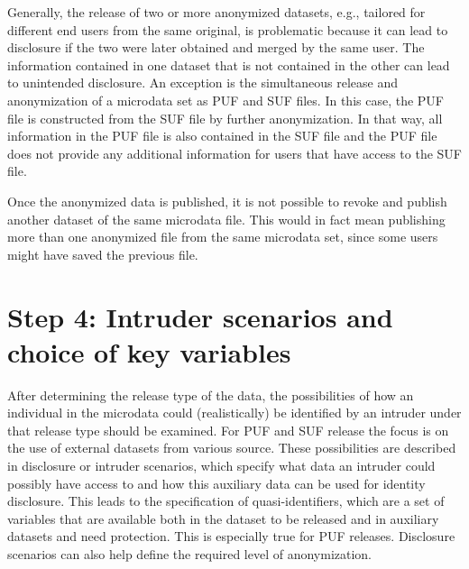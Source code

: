 \documentclass[letterpaper,10pt,english]{sphinxmanual}
\begin{document}
Generally, the release of two or more anonymized datasets, e.g.,
tailored for different end users from the same original, is problematic
because it can lead to disclosure if the two were later obtained and
merged by the same user. The information contained in one dataset that
is not contained in the other can lead to unintended disclosure. An
exception is the simultaneous release and anonymization of a microdata
set as PUF and SUF files. In this case, the PUF file is constructed from
the SUF file by further anonymization. In that way, all information in
the PUF file is also contained in the SUF file and the PUF file does not
provide any additional information for users that have access to the SUF
file.

 Once the anonymized data is published, it is not
possible to revoke and publish another dataset of the same microdata
file. This would in fact mean publishing more than one anonymized file
from the same microdata set, since some users might have saved the
previous file.


\section{Step 4: Intruder scenarios and choice of key variables}
\label{\detokenize{process:step-4-intruder-scenarios-and-choice-of-key-variables}}
After determining the release type of the data, the possibilities of how
an individual in the microdata could (realistically) be identified by an
intruder under that release type should be examined. For PUF and SUF
release the focus is on the use of external datasets from various
source. These possibilities are described in disclosure or intruder
scenarios, which specify what data an intruder could possibly have
access to and how this auxiliary data can be used for identity
disclosure. This leads to the specification of quasi-identifiers, which
are a set of variables that are available both in the dataset to be
released and in auxiliary datasets and need protection.  This is especially true for PUF releases. Disclosure
scenarios can also help define the required level of anonymization.
\end{document}
